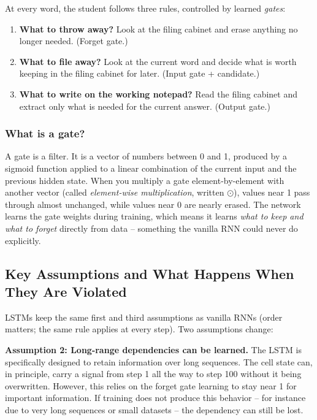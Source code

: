 \documentclass[12pt,a4paper]{article}
\begin{document}
At every word, the student follows three rules, controlled by learned \textit{gates}:

\begin{enumerate}
    \item \textbf{What to throw away?} Look at the filing cabinet and erase anything
    no longer needed. (Forget gate.)
    \item \textbf{What to file away?} Look at the current word and decide what is
    worth keeping in the filing cabinet for later. (Input gate + candidate.)
    \item \textbf{What to write on the working notepad?} Read the filing cabinet and
    extract only what is needed for the current answer. (Output gate.)
\end{enumerate}

\subsubsection{What is a gate?}

A gate is a filter. It is a vector of numbers between 0 and 1, produced by a sigmoid
function applied to a linear combination of the current input and the previous hidden
state. When you multiply a gate element-by-element with another vector (called
\textit{element-wise multiplication}, written $\odot$), values near 1 pass through
almost unchanged, while values near 0 are nearly erased. The network learns the gate
weights during training, which means it learns \textit{what to keep and what to
forget} directly from data -- something the vanilla RNN could never do explicitly.

\subsection{Key Assumptions and What Happens When They Are Violated}

LSTMs keep the same first and third assumptions as vanilla RNNs (order matters; the
same rule applies at every step). Two assumptions change:

\textbf{Assumption 2: Long-range dependencies can be learned.} The LSTM is
specifically designed to retain information over long sequences. The cell state can,
in principle, carry a signal from step 1 all the way to step 100 without it being
overwritten. However, this relies on the forget gate learning to stay near 1 for
important information. If training does not produce this behavior -- for instance due to
very long sequences or small datasets -- the dependency can still be lost.
\end{document}
